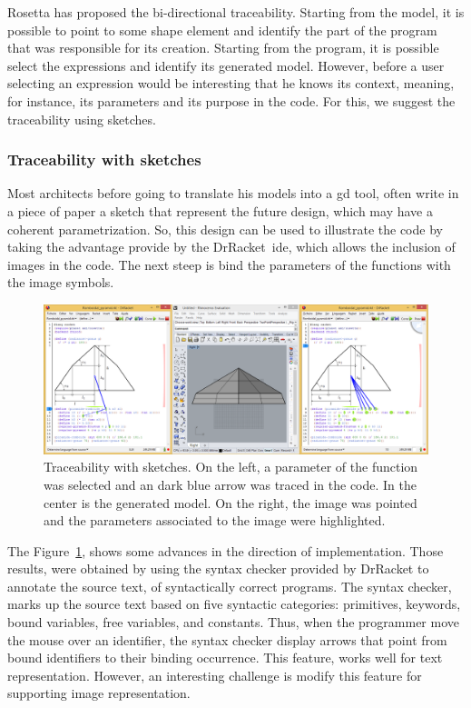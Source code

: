 Rosetta has proposed the bi-directional traceability. Starting from the model, it is possible to point to some shape element and identify the part of the program that was responsible for its creation. Starting from the program, it is possible select the expressions and identify its generated model. However, before a user selecting an expression would be interesting that he knows its context, meaning, for instance, its parameters and its purpose in the code. For this, we suggest the traceability using sketches.

\subsubsection{Traceability with sketches}

Most architects before going to translate his models into a \ac{gd} tool, often write in a piece of paper a sketch that represent the future design, which may have a coherent parametrization. So, this design can be used to illustrate the code by taking the advantage provide by the DrRacket~\ac{ide}, which allows the inclusion of images in the code. The next steep is bind the parameters of the functions with the image symbols.

\begin{figure}[h]
  \centering
  \includegraphics[scale=0.26]{img/rosetta2}
    \caption{Traceability with sketches. On the left, a parameter of the function was selected and an dark blue arrow was traced in the code. In the center is the generated model. On the right, the image was pointed and the parameters associated to the image were highlighted.}
  \label{fig:trace}
\end{figure}

The Figure~\ref{fig:trace}, shows some advances in the direction of implementation. Those results, were obtained by using the syntax checker provided by DrRacket to annotate the source text, of syntactically correct programs. The syntax checker, marks up the source text based on five syntactic categories: primitives, keywords, bound variables, free variables, and constants. Thus, when the programmer move the mouse over an identifier, the syntax checker display arrows that point from bound identifiers to their binding occurrence. This feature, works well for text representation. However, an interesting challenge is modify this feature for supporting image representation.

